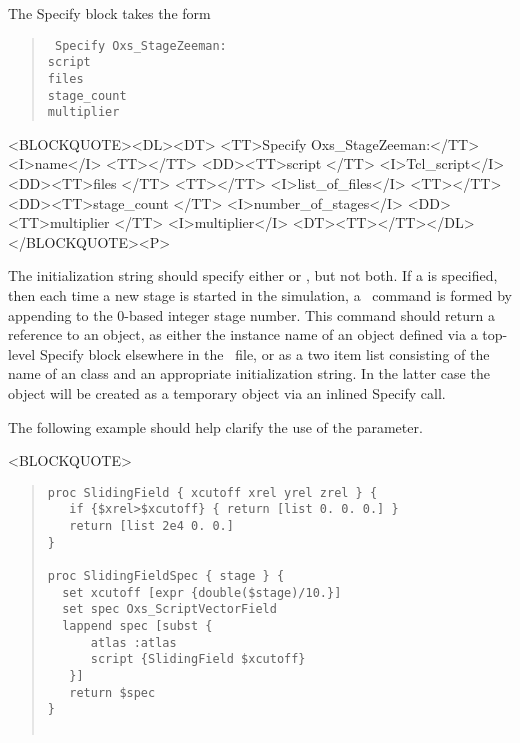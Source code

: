 \begin{itemize}
\begin{description}
   The Specify block takes the form
      \begin{latexonly}
      \begin{quote}\tt
      Specify Oxs\_StageZeeman: \ocb\\
       \bi script \\
       \bi files \ocb{}\ccb\\
       \bi stage\_count  \\
       \bi multiplier \\
      \ccb
      \end{quote}
      \end{latexonly}
      \begin{rawhtml}<BLOCKQUOTE><DL><DT>
      <TT>Specify Oxs_StageZeeman:</TT><I>name</I> <TT>{</TT>
      <DD><TT>script </TT> <I>Tcl_script</I>
      <DD><TT>files </TT> <TT>{</TT> <I>list_of_files</I> <TT>}</TT>
      <DD><TT>stage_count </TT> <I>number_of_stages</I>
      <DD><TT>multiplier </TT> <I>multiplier</I>
      <DT><TT>}</TT></DL></BLOCKQUOTE><P>
      \end{rawhtml}
   The initialization string should specify either  or
   , but not both.  If a  is specified,
   then each time a new stage is started in the simulation, a \Tcl\
   command is formed by appending to  the 0-based
   integer stage number.  This command should return a reference to an
   \cd{Oxs\_VectorField} object, as either the instance name of an
   object defined via a top-level Specify block elsewhere in the
   \MIF\ file, or as a two item list consisting of the name of an
    class and an appropriate initialization string.
   In the latter case the \cd{Oxs\_VectorField} object will be created
   as a temporary object via an inlined Specify call.

   The following example should help clarify the use of the 
   parameter.
\begin{rawhtml}<BLOCKQUOTE>\end{rawhtml}
\begin{quote}
\begin{verbatim}
proc SlidingField { xcutoff xrel yrel zrel } {
   if {$xrel>$xcutoff} { return [list 0. 0. 0.] }
   return [list 2e4 0. 0.]
}

proc SlidingFieldSpec { stage } {
  set xcutoff [expr {double($stage)/10.}]
  set spec Oxs_ScriptVectorField
  lappend spec [subst {
      atlas :atlas
      script {SlidingField $xcutoff}
   }]
   return $spec
}


\end{verbatim}
\end{quote}
\end{description}
\end{itemize}
